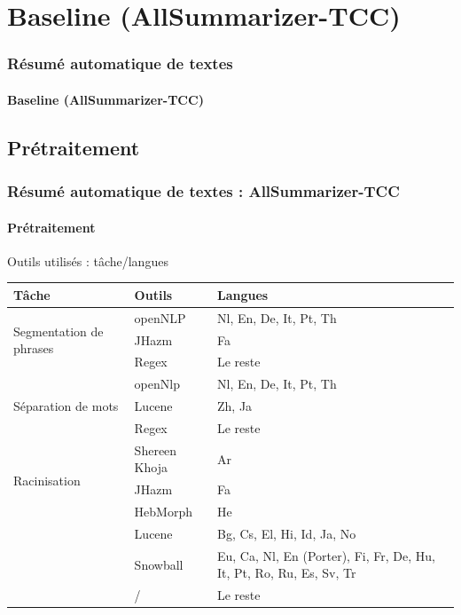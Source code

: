 \documentclass[xcolor=table]{beamer}
\begin{document}
%
\section{Baseline (AllSummarizer-TCC)} 

\begin{frame}
\frametitle{Résumé automatique de textes}
\framesubtitle{Baseline (AllSummarizer-TCC)}
	
	
\end{frame}

\subsection{Prétraitement}

\begin{frame}
\frametitle{Résumé automatique de textes : AllSummarizer-TCC}
\framesubtitle{Prétraitement}
	
\begin{block}{Outils utilisés : tâche/langues}
	\scriptsize\bfseries
	\begin{tabular}{p{}p{}p{}} 
		\hline \hline
		Tâche & Outils & Langues \\
		\hline
		\multirow{3}{2cm}{Segmentation de phrases} & openNLP & Nl, En, De, It, Pt, Th \\
		\cline{2-3}
		& JHazm & Fa \\
		\cline{2-3}
		& Regex & Le reste \\
		\hline
		\multirow{3}{2cm}{Séparation de mots} & openNlp & Nl, En, De, It, Pt, Th \\
		\cline{2-3}
		& Lucene & Zh, Ja \\
		\cline{2-3}
		& Regex & Le reste \\
		\hline
		\multirow{3}{2cm}{Racinisation} & Shereen Khoja & Ar \\
		\cline{2-3}
		& JHazm & Fa \\
		\cline{2-3}
		& HebMorph & He \\
		\cline{2-3}
		& Lucene & Bg, Cs, El, Hi, Id, Ja, No \\
		\cline{2-3}
		& Snowball & Eu, Ca, Nl, En (Porter), Fi, Fr, De, Hu, It, Pt, Ro, Ru, Es, Sv, Tr \\
		\cline{2-3}
		& / & Le reste \\
		\hline \hline
	\end{tabular}
\end{block}

\end{frame}
\end{document}
